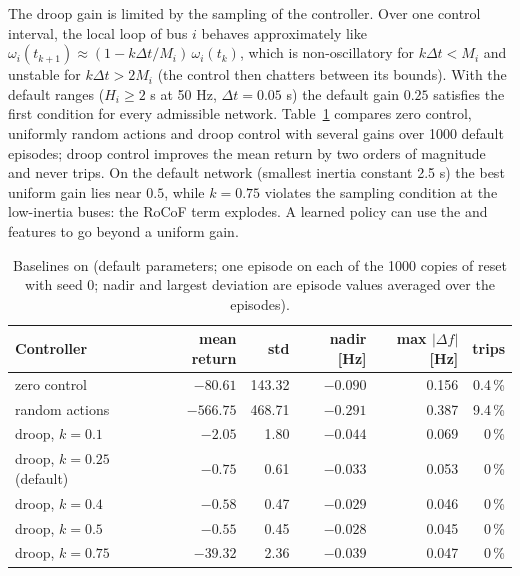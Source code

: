 The droop gain is limited by the sampling of the controller. Over one control
interval, the local loop of bus $i$ behaves approximately like
$\omega_i(t_{k+1}) \approx (1 - k\Delta t / M_i)\,\omega_i(t_k)$, which is
non-oscillatory for $k\Delta t < M_i$ and unstable for $k\Delta t > 2M_i$ (the
control then chatters between its bounds). With the default ranges
($H_i \ge 2$ s at 50 Hz, $\Delta t = 0.05$ s) the default gain $0.25$ satisfies
the first condition for every admissible network. Table~\ref{tab:power-grid-baseline}
compares zero control, uniformly random actions and droop control with several
gains over 1000 default episodes; droop control improves the mean return by two
orders of magnitude and never trips. On the default network (smallest inertia
constant 2.5 s) the best uniform gain lies near $0.5$, while $k = 0.75$ violates
the sampling condition at the low-inertia buses: the RoCoF term explodes. A
learned policy can use the  and  features to go beyond
a uniform gain.

\begin{table}[htbp]
  \centering\small
  \caption{Baselines on  (default parameters; one episode on each
    of the 1000 copies of  reset with seed 0;
    nadir and largest deviation are episode values averaged over the episodes).}
  \label{tab:power-grid-baseline}
  \begin{tabular}{@{}lrrrrr@{}}
    \toprule
    Controller & mean return & std & nadir [Hz] & max $|\Delta f|$ [Hz] & trips \\
    \midrule
    zero control      & $-80.61$  & 143.32 & $-0.090$ & 0.156 & 0.4\,\% \\
    random actions    & $-566.75$ & 468.71 & $-0.291$ & 0.387 & 9.4\,\% \\
    droop, $k = 0.1$  & $-2.05$   & 1.80   & $-0.044$ & 0.069 & 0\,\% \\
    droop, $k = 0.25$ (default) & $-0.75$ & 0.61 & $-0.033$ & 0.053 & 0\,\% \\
    droop, $k = 0.4$  & $-0.58$   & 0.47   & $-0.029$ & 0.046 & 0\,\% \\
    droop, $k = 0.5$  & $-0.55$   & 0.45   & $-0.028$ & 0.045 & 0\,\% \\
    droop, $k = 0.75$ & $-39.32$  & 2.36   & $-0.039$ & 0.047 & 0\,\% \\
    \bottomrule
  \end{tabular}
\end{table}

